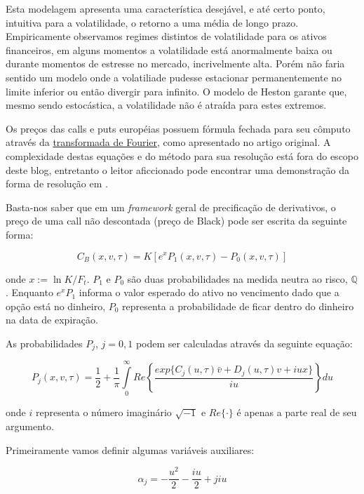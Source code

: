 \documentclass[]{book}
\theoremstyle{definition}
\theoremstyle{definition}
\theoremstyle{definition}
\theoremstyle{remark}
\begin{document}
Esta modelagem apresenta uma característica desejável, e até certo
ponto, intuitiva para a volatilidade, o retorno a uma média de longo
prazo. Empiricamente observamos regimes distintos de volatilidade para
os ativos financeiros, em alguns momentos a volatilidade está
anormalmente baixa ou durante momentos de estresse no mercado,
incrivelmente alta. Porém não faria sentido um modelo onde a volatiliade
pudesse estacionar permanentemente no limite inferior ou então divergir
para infinito. O modelo de Heston garante que, mesmo sendo estocástica,
a volatilidade não é atraída para estes extremos.

Os preços das calls e puts européias possuem fórmula fechada para seu
cômputo através da
\href{https://en.wikipedia.org/wiki/Fourier_transform}{transformada de
Fourier}, como apresentado no artigo original. A complexidade destas
equações e do método para sua resolução está fora do escopo deste blog,
entretanto o leitor aficcionado pode encontrar uma demonstração da forma
de resolução em \citet{Gatheral2011}.

Basta-nos saber que em um \emph{framework} geral de precificação de
derivativos, o preço de uma call não descontada (preço de Black) pode
ser escrita da seguinte forma:

\begin{equation}
C_B(x, v, \tau)=K\left[e^xP_1(x, v, \tau)-P_0(x, v, \tau)\right]
\label{eq:callgeral}
\end{equation}

onde \(x:=\ln K/F_t\). \(P_1\) e \(P_0\) são duas probabilidades na
medida neutra ao risco, \(\mathbb Q\). Enquanto \(e^xP_1\) informa o
valor esperado do ativo no vencimento dado que a opção está no dinheiro,
\(P_0\) representa a probabilidade de ficar dentro do dinheiro na data
de expiração.

As probabilidades \(P_j\), \(j = 0, 1\) podem ser calculadas através da
seguinte equação:

\begin{equation}
P_j(x, v, \tau)=\frac{1}{2}+\frac{1}{\pi}\int\limits_0^\infty
    Re\left\lbrace\frac{exp\{C_j(u, \tau)\bar v + D_j(u, \tau)v + iux\}}{iu}\right\rbrace du
\label{eq:pj}
\end{equation}

onde \(i\) representa o número imaginário \(\sqrt{-1}\) e
\(Re\{\cdot\}\) é apenas a parte real de seu argumento.

Primeiramente vamos definir algumas variáveis auxiliares:

\[\alpha_j=-\frac{u^2}{2}-\frac{iu}{2}+jiu\]
\end{document}
